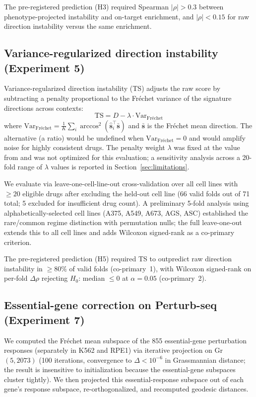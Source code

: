 \documentclass[11pt]{article}
\begin{document}
The pre-registered prediction (H3) required Spearman $|\rho| > 0.3$ between
phenotype-projected instability and on-target enrichment, and $|\rho| < 0.15$
for raw direction instability versus the same enrichment.

\subsection{Variance-regularized direction instability (Experiment 5)}

Variance-regularized direction instability (TS) adjusts the raw score by
subtracting a penalty proportional to the Fr\'{e}chet variance of the
signature directions across contexts:
\begin{equation}
  \text{TS} = D - \lambda \cdot \text{Var}_{\text{Fr\'echet}}
  \label{eq:ts}
\end{equation}
where $\text{Var}_{\text{Fr\'echet}} = \frac{1}{K}\sum_i
\arccos^2(\hat{\mathbf{s}}_i^\top \bar{\mathbf{s}})$ and
$\bar{\mathbf{s}}$ is the Fr\'echet mean direction. The alternative (a ratio) would be
undefined when $\text{Var}_{\text{Fr\'echet}} = 0$ and would amplify
noise for highly consistent drugs. The penalty weight $\lambda$ was fixed
at the value from \citet{tower2026drug} and was not optimized for this
evaluation; a sensitivity analysis across a 20-fold range of $\lambda$
values is reported in Section~\ref{sec:limitations}.

We evaluate via leave-one-cell-line-out cross-validation over all cell
lines with $\geq 20$ eligible drugs after excluding the held-out cell line
(66 valid folds out of 71 total; 5 excluded for insufficient drug count).
A preliminary 5-fold analysis using alphabetically-selected cell lines
(A375, A549, A673, AGS, ASC) established the rare/common regime distinction
with permutation nulls; the full leave-one-out extends this to all cell
lines and adds Wilcoxon signed-rank as a co-primary criterion.

The pre-registered prediction (H5) required TS to outpredict raw direction instability
in $\geq 80\%$ of valid folds (co-primary~1), with Wilcoxon signed-rank on
per-fold $\Delta\rho$ rejecting $H_0$: median $\leq 0$ at $\alpha = 0.05$
(co-primary~2).

\subsection{Essential-gene correction on Perturb-seq (Experiment 7)}

We computed the Fr\'echet mean subspace of the 855 essential-gene
perturbation responses (separately in K562 and RPE1) via iterative
projection on Gr$(5, 2073)$ (100 iterations, convergence to
$\Delta < 10^{-6}$ in Grassmannian distance; the result is insensitive
to initialization because the essential-gene subspaces cluster tightly).
We then projected this essential-response subspace out of each gene's
response subspace, re-orthogonalized, and recomputed geodesic distances.
\end{document}
